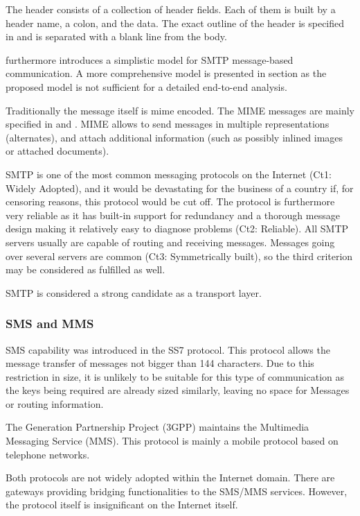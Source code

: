 The header consists of a collection of header fields. Each of them is built by a header name, a colon, and the data. The exact outline of the header is specified in \cite{rfc5322} and is separated with a blank line from the body. 

\cite{rfc5321} furthermore introduces a simplistic model for SMTP message-based communication. A more comprehensive model is presented in section  as the proposed model is not sufficient for a detailed end-to-end analysis.

Traditionally the message itself is mime encoded. The MIME messages are mainly specified in \cite{rfc2045} and \cite{rfc2046}. MIME allows to send messages in multiple representations (alternates), and attach additional information (such as possibly inlined images or attached documents). 

SMTP is one of the most common messaging protocols on the Internet (Ct1: Widely Adopted), and it would be devastating for the business of a country if, for censoring reasons, this protocol would be cut off. The protocol is furthermore very reliable as it has built-in support for redundancy and a thorough message design making it relatively easy to diagnose problems (Ct2: Reliable). All SMTP servers usually are capable of routing and receiving messages. Messages going over several servers are common (Ct3: Symmetrically built), so the third criterion may be considered as fulfilled as well.

SMTP is considered a strong candidate as a transport layer.  

\subsubsection{SMS and MMS}
SMS capability was introduced in the SS7 protocol. This protocol allows the message transfer of messages not bigger than 144 characters. Due to this restriction in size, it is unlikely to be suitable for this type of communication as the keys being required are already sized similarly, leaving no space for Messages or routing information.

The  Generation Partnership Project (3GPP) maintains the Multimedia Messaging Service (MMS). This protocol is mainly a mobile protocol based on telephone networks.

Both protocols are not widely adopted within the Internet domain. There are gateways providing bridging functionalities to the SMS/MMS services. However, the protocol itself is insignificant on the Internet itself. 

